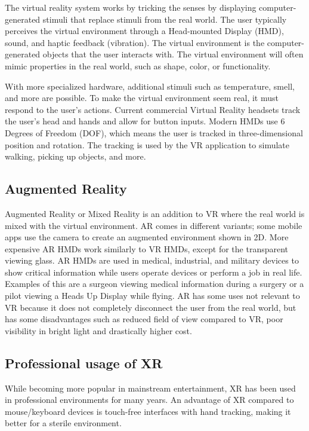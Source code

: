 \documentclass[a4paper]{report}
\begin{document}
The virtual reality system works by tricking the senses by displaying computer-generated stimuli that replace stimuli from the real world. 
The user typically perceives the virtual environment through a Head-mounted Display (HMD), sound, and haptic feedback (vibration).
The virtual environment is the computer-generated objects that the user interacts with. The virtual environment will often mimic properties in the real world, such as shape, color, or functionality.

With more specialized hardware, additional stimuli such as temperature, smell, and more are possible\cite{noauthor_feelreal_nodate}.
To make the virtual environment seem real, it must respond to the user's actions. Current commercial Virtual Reality headsets track the user's head and hands and allow for button inputs\cite{noauthor_oculus_nodate}. Modern HMDs use 6 Degrees of Freedom (DOF), which means the user is tracked in three-dimensional position and rotation\cite{lang_introduction_2013}. The tracking is used by the VR application to simulate walking, picking up objects, and more.

\subsection{ Augmented Reality }
Augmented Reality or Mixed Reality is an addition to VR where the real world is mixed with the virtual environment\cite{hackett_three-dimensional_2016}. AR comes in different variants; some mobile apps use the camera to create an augmented environment shown in 2D. More expensive AR HMDs work similarly to VR HMDs, except for the transparent viewing glass.
AR HMDs are used in medical, industrial, and military devices to show critical information while users operate devices or perform a job in real life. Examples of this are a surgeon viewing medical information during a surgery or a pilot viewing a Heads Up Display while flying\cite{mihelj_virtual_2014}\cite{mertz_virtual_2019}.
AR has some uses not relevant to VR because it does not completely disconnect the user from the real world, but has some disadvantages such as reduced field of view compared to VR, poor visibility in bright light\cite{hackett_three-dimensional_2016} and drastically higher cost\cite{medical_holodeck_medicalholodeck_nodate}.

\subsection{Professional usage of XR}
While becoming more popular in mainstream entertainment, XR has been used in professional environments for many years.
An advantage of XR compared to mouse/keyboard devices is touch-free interfaces with hand tracking, making it better for a sterile environment\cite{andrews_extended_2019}.
\end{document}
